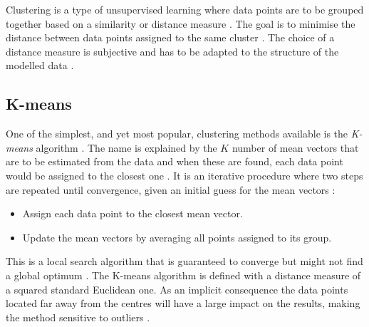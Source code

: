 Clustering is a type of unsupervised learning where data points are to be grouped together based on a similarity or distance measure \parencite{Hastie2001}. The goal is to minimise the distance between data points assigned to the same cluster \parencite{Hastie2001}. The choice of a distance measure is subjective and has to be adapted to the structure of the modelled data \parencite{Hastie2001}.

\subsection{K-means}
One of the simplest, and yet most popular, clustering methods available is the \emph{K-means} algorithm \parencite{Hastie2001}. The name is explained by the $K$ number of mean vectors that are to be estimated from the data and when these are found, each data point would be assigned to the closest one \parencite{Alpaydin2010}. It is an iterative procedure where two steps are repeated until convergence, given an initial guess for the mean vectors \parencite{Alpaydin2010}:
\begin{itemize}
  \item Assign each data point to the closest mean vector.
  \item Update the mean vectors by averaging all points assigned to its group.
\end{itemize}

This is a local search algorithm that is guaranteed to converge but might not find a global optimum \parencite{Hastie2001}. The K-means algorithm is defined with a distance measure of a squared standard Euclidean one. As an implicit consequence the data points located far away from the centres will have a large impact on the results, making the method sensitive to outliers \parencite{Hastie2001}. 

